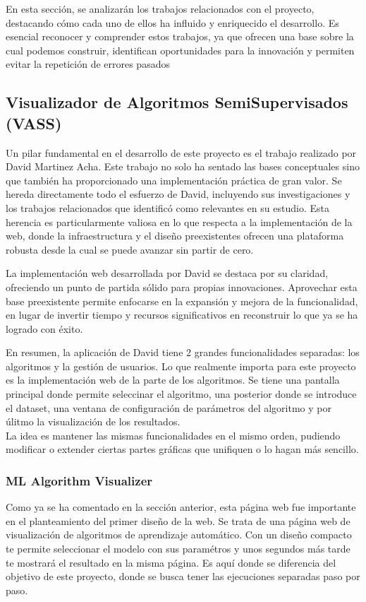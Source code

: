 En esta sección, se analizarán los trabajos relacionados con el proyecto, destacando cómo cada uno de ellos ha influido y enriquecido el desarrollo. Es esencial reconocer y comprender estos trabajos, ya que ofrecen una base sobre la cual podemos construir, identifican oportunidades para la innovación y permiten evitar la repetición de errores pasados
\subsection{Visualizador de Algoritmos SemiSupervisados (VASS)}
Un pilar fundamental en el desarrollo de este proyecto es el trabajo realizado por David Martinez Acha. Este trabajo no solo ha sentado las bases conceptuales sino que también ha proporcionado una implementación práctica de gran valor. Se hereda directamente todo el esfuerzo de David, incluyendo sus investigaciones y los trabajos relacionados que identificó como relevantes en su estudio. Esta herencia es particularmente valiosa en lo que respecta a la implementación de la web, donde la infraestructura y el diseño preexistentes ofrecen una plataforma robusta desde la cual se puede avanzar sin partir de cero.

La implementación web desarrollada por David se destaca por su claridad, ofreciendo un punto de partida sólido para propias innovaciones. Aprovechar esta base preexistente permite enfocarse en la expansión y mejora de la funcionalidad, en lugar de invertir tiempo y recursos significativos en reconstruir lo que ya se ha logrado con éxito.

En resumen, la aplicación de David tiene 2 grandes funcionalidades separadas: los algoritmos y la gestión de usuarios. Lo que realmente importa para este proyecto es la implementación web de la parte de los algoritmos. Se tiene una pantalla principal donde permite seleccinar el algoritmo, una posterior donde se introduce el dataset, una ventana de configuración de parámetros del algoritmo y por úlitmo la visualización de los resultados.\\
La idea es mantener las mismas funcionalidades en el mismo orden, pudiendo modificar o extender ciertas partes gráficas que unifiquen o lo hagan más sencillo.

\subsubsection{ML Algorithm Visualizer}
Como ya se ha comentado en la sección anterior, esta página web fue importante en el planteamiento del primer diseño de la web. Se trata de una página web de visualización de algoritmos de aprendizaje automático. Con un diseño compacto te permite seleccionar el modelo con sus paramétros y unos segundos más tarde te mostrará el resultado en la misma página. Es aquí donde se diferencia del objetivo de este proyecto, donde se busca tener las ejecuciones separadas paso por paso.